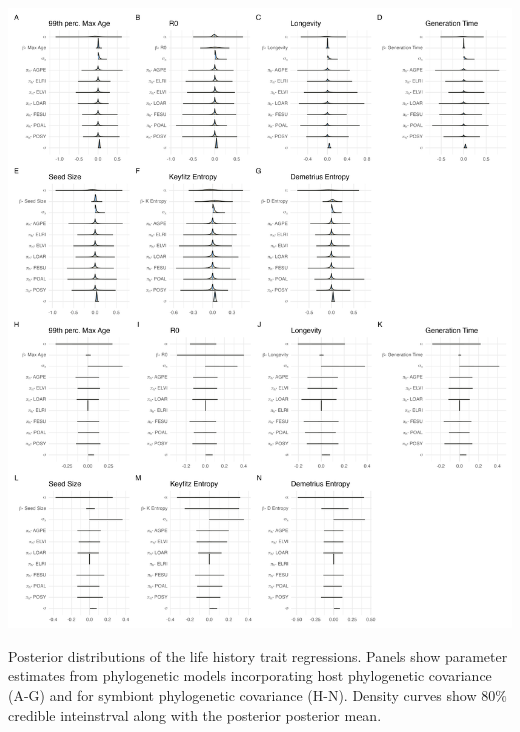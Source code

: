 \documentclass[lineno, sn-basic]{sn-jnl}%
\providecommand{\DIFaddbegin}{} %
\providecommand{\DIFaddend}{} %
\providecommand{\DIFdelbegin}{} %
\providecommand{\DIFdelend}{} %
\providecommand{\DIFaddbeginFL}{} %
\providecommand{\DIFaddendFL}{} %
\providecommand{\DIFdelbeginFL}{} %
\providecommand{\DIFdelendFL}{} %
\newcommand{\DIFscaledelfig}{0.5}
\newlength{\DIFdelgraphicswidth} %
\newlength{\DIFdelgraphicsheight} %
\newcommand{\DIFaddincludegraphics}[2][]{{\color{blue}\fbox{\DIFOincludegraphics[#1]{#2}}}} %
\newcommand{\DIFdelincludegraphics}[2][]{%
\sbox{\DIFdelgraphicsbox}{\DIFOincludegraphics[#1]{#2}}%
\settoboxwidth{\DIFdelgraphicswidth}{\DIFdelgraphicsbox} %
\settoboxtotalheight{\DIFdelgraphicsheight}{\DIFdelgraphicsbox} %
\scalebox{\DIFscaledelfig}{%
\parbox[b]{\DIFdelgraphicswidth}{\usebox{\DIFdelgraphicsbox}\\[-\baselineskip] \rule{\DIFdelgraphicswidth}{0em}}\llap{\resizebox{\DIFdelgraphicswidth}{\DIFdelgraphicsheight}{%
\setlength{\unitlength}{\DIFdelgraphicswidth}%
\begin{picture}(1,1)%
\thicklines\linethickness{2pt} %
{\color[rgb]{1,0,0}\put(0,0){\framebox(1,1){}}}%
{\color[rgb]{1,0,0}\put(0,0){\line( 1,1){1}}}%
{\color[rgb]{1,0,0}\put(0,1){\line(1,-1){1}}}%
\end{picture}%
}\hspace*{3pt}}} %
} %
\DeclareRobustCommand{\DIFaddbegin}{\DIFOaddbegin \let\includegraphics\DIFaddincludegraphics} %
\DeclareRobustCommand{\DIFaddend}{\DIFOaddend \let\includegraphics\DIFOincludegraphics} %
\DeclareRobustCommand{\DIFdelbegin}{\DIFOdelbegin \let\includegraphics\DIFdelincludegraphics} %
\DeclareRobustCommand{\DIFdelend}{\DIFOaddend \let\includegraphics\DIFOincludegraphics} %
\DeclareRobustCommand{\DIFaddbeginFL}{\DIFOaddbeginFL \let\includegraphics\DIFaddincludegraphics} %
\DeclareRobustCommand{\DIFaddendFL}{\DIFOaddendFL \let\includegraphics\DIFOincludegraphics} %
\DeclareRobustCommand{\DIFdelbeginFL}{\DIFOdelbeginFL \let\includegraphics\DIFdelincludegraphics} %
\DeclareRobustCommand{\DIFdelendFL}{\DIFOaddendFL \let\includegraphics\DIFOincludegraphics} %
\begin{document}
\DIFdelbegin %
\DIFdelendFL \DIFaddbeginFL \begin{myfigure}[H]
	\DIFaddendFL \centering
	\includegraphics[width=\linewidth]{lh_allposteriors_plot.png}
	\DIFdelbeginFL %
\DIFdelendFL \DIFaddbeginFL \caption[Posterior distributions of the life history trait regressions]{\DIFaddendFL Posterior distributions of the life history trait regressions. Panels show parameter estimates from phylogenetic models incorporating host phylogenetic covariance (A-G) and for symbiont phylogenetic covariance (H-N). Density curves show $80\%$ credible inteinstrval along with the posterior posterior mean.}
\DIFdelbeginFL %
\DIFdelend \DIFaddbegin \end{myfigure}
\DIFaddend 
\end{document}
